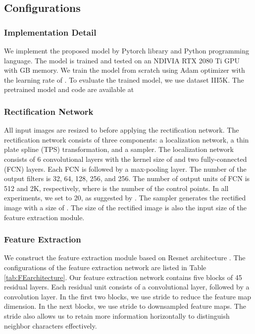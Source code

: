 \subsection{Configurations}
\subsubsection{Implementation Detail}
We implement the proposed model by Pytorch library and Python programming language. The model is trained and tested on an NDIVIA RTX 2080 Ti GPU with  GB memory. We train the model from scratch using Adam optimizer with the learning rate of . To evaluate the trained model, we use dataset III5K. The pretrained model and code are available at \cite{sourcecode}

\subsubsection{Rectification Network} 
All input images are resized to  before applying the rectification network. The rectification network consists of three components: a localization network, a thin plate spline (TPS) transformation,  and a sampler. The localization network consists of 6 convolutional layers with the kernel size of  and two fully-connected (FCN) layers. Each FCN is followed by a  max-pooling layer. The number of the output filters is 32, 64, 128, 256, and 256. The number of output units of FCN is 512 and 2K, respectively, where  is the number of the control points. In all experiments, we set  to 20, as suggested by \cite{shi2018aster}. The sampler generates the rectified image with a size of . The size of the rectified image is also the input size of the feature extraction module. 

\subsubsection{Feature Extraction} We construct the feature extraction module based on Resnet architecture \cite{he2016deep}. The configurations of the feature extraction network are listed in Table \ref{tab:FEarchitecture}. Our feature extraction network contains five blocks of 45 residual layers. Each residual unit consists of a  convolutional layer, followed by a  convolution layer. In the first two blocks, we use  stride to reduce the feature map dimension. In the next blocks, we use  stride to downsampled feature maps. The  stride also allows us to retain more information horizontally to distinguish neighbor characters effectively.

